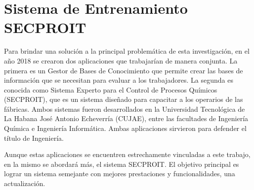 
\section{Sistema de Entrenamiento SECPROIT}
Para brindar una solución a la principal problemática de esta investigación, en el año 2018 se crearon dos aplicaciones que trabajarían de manera conjunta. La primera es un Gestor de Bases de Conocimiento que permite crear las bases de información que se necesitan para evaluar a los trabajadores. La segunda es conocida como Sistema Experto para el Control de Procesos Químicos (SECPROIT), que es un sistema diseñado para capacitar a los operarios de las fábricas. Ambos sistemas fueron desarrollados en la Universidad Tecnológica de La Habana José Antonio Echeverría (CUJAE), entre las facultades de Ingeniería Química e Ingeniería Informática. Ambas aplicaciones sirvieron para defender el título de Ingeniería.

Aunque estas aplicaciones se encuentren estrechamente vinculadas a este trabajo, en la mismo se abordará más, el sistema SECPROIT. El objetivo principal es lograr un sistema semejante con mejores prestaciones y funcionalidades, una actualización.